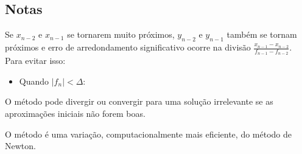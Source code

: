 \subsection{Notas}

\begin{enumerar}
 \item Se $x_{n-2}$ e $x_{n-1}$ se tornarem muito próximos, $y_{n-2}$ e $y_{n-1}$ também se tornam próximos e erro de arredondamento significativo ocorre na divisão $ \displaystyle \frac{x_{n-1} - x_{n-2}}{f_{n-1} - f_{n-2}} $. Para evitar isso:

\begin{itemize}
 \item Quando $ |f_{n}| < \Delta$:


\end{itemize}

 \item O método pode divergir ou convergir para uma solução irrelevante se as aproximações iniciais não forem boas.

 \item O método é uma variação, computacionalmente mais eficiente, do método de Newton.

 \end{enumerar}

